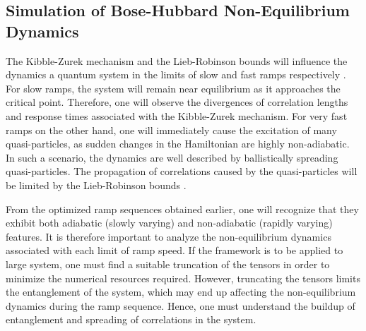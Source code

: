 \subsection{Simulation of Bose-Hubbard Non-Equilibrium Dynamics}
The Kibble-Zurek mechanism and the Lieb-Robinson bounds will influence the dynamics a quantum system in the limits of slow and fast ramps respectively \cite{Lauchli2008,Braun2015}. For slow ramps, the system will remain near equilibrium as it approaches the critical point. Therefore, one will observe the divergences of correlation lengths and response times associated with the Kibble-Zurek mechanism. For very fast ramps on the other hand, one will immediately cause the excitation of many quasi-particles, as sudden changes in the Hamiltonian are highly non-adiabatic. In such a scenario, the dynamics are well described by ballistically spreading quasi-particles. The propagation of correlations caused by the quasi-particles will be limited by the Lieb-Robinson bounds  \cite{Cheneau2012,Calabrese2006}.

From the optimized ramp sequences obtained earlier, one will recognize that they exhibit both adiabatic (slowly varying) and non-adiabatic (rapidly varying) features.  It is therefore important to analyze the non-equilibrium dynamics associated with each limit of ramp speed. If the framework is to be applied to large system, one must find a suitable truncation of the tensors in order to minimize the numerical resources required. However, truncating the tensors limits the entanglement of the system, which may end up affecting the non-equilibrium dynamics during the ramp sequence. Hence, one must understand the buildup of entanglement and spreading of correlations in the system.\\

